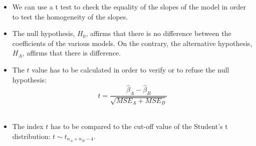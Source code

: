 \begin{frame}
  \vspace*{0.25cm}
  \begin{itemize}
    \item We can use a t test to check the equality of the slopes of the model in order to test the homogeneity of the slopes.
    \vspace{0.2cm}
    \item The null hypothesis, $ H_0 $, affirms that there is no difference between the coefficients of the various models. On the contrary, the alternative hypothesis, $ H_A $, affirms that there is difference.
    \vspace{0.2cm}
    \item The $ t $ value has to be calculated in order to verify or to refuse the null hypothesis:
      $$ t = \frac{\hat{\beta}_A - \hat{\beta}_B}{\sqrt{MSE_A + MSE_B}} $$\\
    \vspace{0.2cm}
    \item The index $ t $ has to be compared to the cut-off value of the Student's t distribution: $ t \sim t_{n_A+n_B-4} $.
  \end{itemize}
\end{frame}



